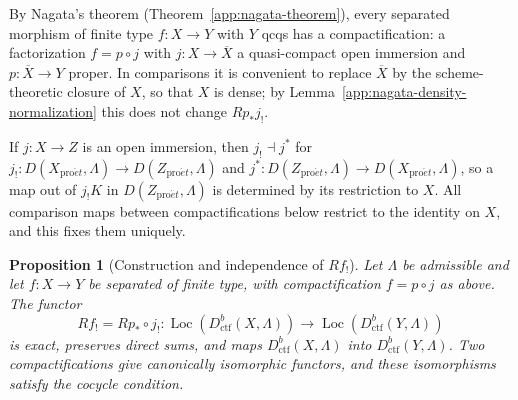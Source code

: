\documentclass[11pt,a4paper]{article}
\numberwithin{equation}{section}
\newtheorem{proposition}[theorem]{Proposition}
\theoremstyle{definition}
\theoremstyle{remark}
\newcommand{\Loc}{\operatorname{Loc}}
\newcommand{\proet}{\mathrm{pro}\acute{e}t}
\newcommand{\Dctf}{D^b_{\mathrm{ctf}}}
\begin{document}
By Nagata's theorem (Theorem~\ref{app:nagata-theorem}), every separated
morphism of finite type $f:X\to Y$ with $Y$ qcqs has a
compactification: a factorization $f=p\circ j$ with
$j:X\to\overline X$ a quasi-compact open immersion and
$p:\overline X\to Y$ proper. In comparisons it
is convenient to replace $\overline X$ by the scheme-theoretic closure
of $X$, so that $X$ is dense; by
Lemma~\ref{app:nagata-density-normalization} this does not change
$Rp_*j_!$.

If $j:X\to Z$ is an open immersion, then $j_!\dashv j^*$ for
$j_!\colon D(X_{\proet},\Lambda)\to D(Z_{\proet},\Lambda)$ and
$j^*\colon D(Z_{\proet},\Lambda)\to D(X_{\proet},\Lambda)$, so a map out of
$j_!K$ in $D(Z_{\proet},\Lambda)$ is determined by its restriction to $X$. All comparison maps
between compactifications below restrict to the identity on $X$, and
this fixes them uniquely.

\begin{proposition}[Construction and independence of $Rf_!$]
\label{b:prop:lower-exceptional-image}
Let $\Lambda$ be admissible and let $f:X\to Y$ be separated of finite
type, with compactification
$f=p\circ j$ as above. The functor
\[
 Rf_!=Rp_*\circ j_!:\Loc(\Dctf(X,\Lambda))\to\Loc(\Dctf(Y,\Lambda))
\]
is exact, preserves direct sums, and maps $\Dctf(X,\Lambda)$ into
$\Dctf(Y,\Lambda)$. Two compactifications give canonically isomorphic
functors, and these isomorphisms satisfy the cocycle condition.
\end{proposition}
\end{document}

